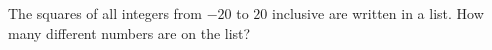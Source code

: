 The squares of all integers from $-20$ to $20$ inclusive are written in a list. How many different numbers are on the list?
